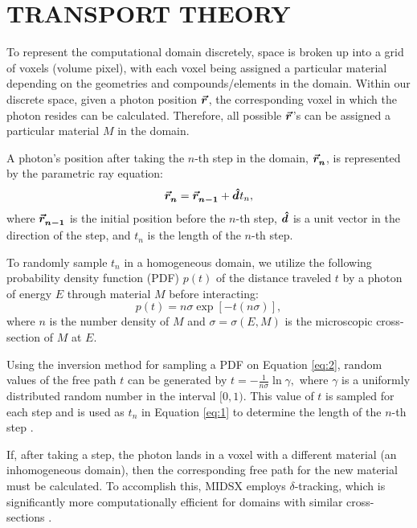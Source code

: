 \section{TRANSPORT THEORY}
\par To represent the computational domain discretely, space is broken up into a grid of voxels (volume pixel), with each voxel being assigned a particular material depending on the geometries and compounds/elements in the domain. Within our discrete space, given a photon position $\bm{\vec{r}_{}^{}}$, the corresponding voxel in which the photon resides can be calculated. Therefore, all possible $\bm{\vec{r}_{}^{}}$'s can be assigned a particular material $M$ in the domain.

\par A photon's position after taking the $n$-th step in the domain, $\bm{\vec{r}_{n}^{}}$, is represented by the parametric ray equation:
\begin{equation} \label{eq:1}
    \bm{\vec{r}_{n}^{}} = \bm{\vec{r}_{n-1}^{}} + \bm{\hat{d}_{}^{}} t_n,
\end{equation}
where $\bm{\vec{r}_{n-1}^{}}$ is the initial position before the $n$-th step, $\bm{\hat{d}_{}^{}}$ is a unit vector in the direction of the step, and $t_n$ is the length of the $n$-th step.

\par To randomly sample $t_n$ in a homogeneous domain, we utilize the following probability density function (PDF) $p(t)$ of the distance traveled $t$ by a photon of energy $E$ through material $M$ before interacting:
\begin{equation} \label{eq:2}
    p(t) = n\sigma \exp{\left[-t(n\sigma)\right]},
\end{equation}
where $n$ is the number density of $M$ and $\sigma = \sigma(E, M)$ is the microscopic cross-section of $M$ at $E$.
\par Using the inversion method for sampling a PDF on Equation \ref{eq:2}, random values of the free path $t$ can be generated by $
    t = -\frac{1}{n\sigma} \ln \gamma, 
    $
where $\gamma$ is a uniformly distributed random number in the interval $[0, 1)$. This value of $t$ is sampled for each step and is used as $t_n$ in Equation \ref{eq:1} to determine the length of the $n$-th step \cite{vassiliev_monte_2017}.
\par If, after taking a step, the photon lands in a voxel with a different material (an inhomogeneous domain), then the corresponding free path for the new material must be calculated. To accomplish this, MIDSX employs $\delta$-tracking, which is significantly more computationally efficient for domains with similar cross-sections \cite{vassiliev_monte_2017}.


